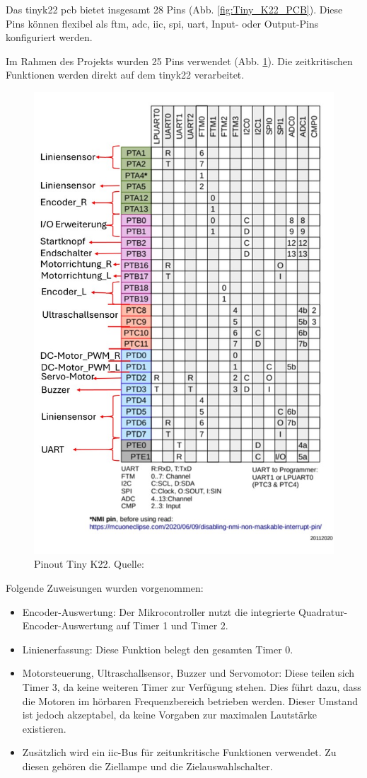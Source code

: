 Das \gls{tinyk22} \acrshort{pcb} bietet insgesamt 28 Pins (Abb. \ref{fig:Tiny_K22_PCB}). Diese Pins können flexibel als \acrfull{ftm}, \acrfull{adc}, \acrfull{iic}, \acrfull{spi}, \acrshort{uart}, Input- oder Output-Pins konfiguriert werden.

Im Rahmen des Projekts wurden 25 Pins verwendet (Abb. \ref{fig:Tiny_K22_Pinout_definition}). Die zeitkritischen Funktionen werden direkt auf dem \gls{tinyk22} verarbeitet.

\begin{figure}[H]
    \centering
    \includegraphics[width=0.8\linewidth, angle=-90]{img/Tiny_K22_Pinout_definition.jpg}
    \caption{Pinout Tiny K22. Quelle: \cite{tiny-K22-Pinout}}
    \label{fig:Tiny_K22_Pinout_definition}
\end{figure}

Folgende Zuweisungen wurden vorgenommen:
\begin{itemize}
    \item Encoder-Auswertung: Der Mikrocontroller nutzt die integrierte Quadratur-Encoder-Auswertung auf Timer 1 und Timer 2.
    \item Linienerfassung: Diese Funktion belegt den gesamten Timer 0.
    \item Motorsteuerung, Ultraschallsensor, Buzzer und Servomotor: Diese teilen sich Timer 3, da keine weiteren Timer zur Verfügung stehen. Dies führt dazu, dass die Motoren im hörbaren Frequenzbereich betrieben werden. Dieser Umstand ist jedoch akzeptabel, da keine Vorgaben zur maximalen Lautstärke existieren.
    \item Zusätzlich wird ein \acrshort{iic}-Bus für zeitunkritische Funktionen verwendet. Zu diesen gehören die Ziellampe und die Zielauswahlschalter.
\end{itemize}

